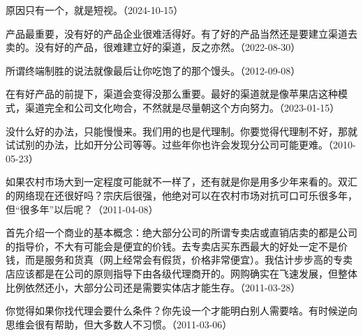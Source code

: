 
原因只有一个，就是短视。（2024-10-15）


产品最重要，没有好的产品企业很难活得好。有了好的产品当然还是要建立渠道去卖的。没有好的产品，很难建立好的渠道，反之亦然。（2022-08-30）


所谓终端制胜的说法就像最后让你吃饱了的那个馒头。（2012-09-08）


在有好产品的前提下，渠道会变得没那么重要。最好的渠道就是像苹果店这种模式，渠道完全和公司文化吻合，不然就是尽量朝这个方向努力。（2023-01-15）


没什么好的办法，只能慢慢来。我们用的也是代理制。你要觉得代理制不好，那就试试别的办法，比如开分公司等等。过些年你也许会发现分公司可能更难。（2010-05-23）


如果农村市场大到一定程度可能就不一样了，还有就是你是用多少年来看的。双汇的网络现在还很好吗？宗庆后很强，他绝对可以在农村市场对抗可口可乐很多年，但“很多年”以后呢？（2011-04-08）


首先介绍一个商业的基本概念：绝大部分公司的所谓专卖店或直销店卖的都是公司的指导价，不大有可能会是便宜的价钱。去专卖店买东西最大的好处一定不是价钱，而是服务和货真（网上经常会有假货，价格非常便宜）。我估计步步高的专卖店应该都是在公司的原则指导下由各级代理商开的。网购确实在飞速发展，但整体比例依然还小，大部分公司还是需要实体店才能生存。（2011-03-28）


你觉得如果你找代理会要什么条件？你先设一个才能明白别人需要啥。有时候逆向思维会很有帮助，但大多数人不习惯。（2011-03-06）

